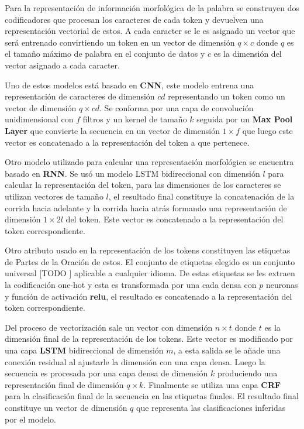 Para la representación de información morfológica de la palabra se construyen dos
codificadores que procesan los caracteres de cada token y devuelven una representación vectorial de estos.
A cada caracter se le es asignado un vector que será entrenado convirtiendo un token en un vector de dimensión
$q \times c$ donde $q$ es el tamaño máximo de palabra en el conjunto de datos y $c$ es la dimensión del vector
asignado a cada caracter.

Uno de estos modelos está basado en \textbf{CNN}, este modelo entrena una representación de caracteres de dimensión
$cd$ representando un token como un vector de dimensión $q \times cd$. Se conforma por una capa de convolución unidimensional
con $f$ filtros y un kernel de tamaño $k$ seguida por un \textbf{Max Pool Layer} que convierte la secuencia en un vector
de dimensión $1 \times f$ que luego este vector es concatenado a la representación del token a que pertenece.

Otro modelo utilizado para calcular una representación morfológica se encuentra basado en \textbf{RNN}. Se usó
un modelo LSTM bidireccional con dimensión $l$ para calcular la representación del token, para las dimensiones de los caracteres se
utilizan vectores de tamaño $l$, el resultado final constituye la concatenación de la corrida hacia adelante y la corrida
hacia atrás formando una representación de dimensión $1 \times 2l$ del token. Este vector es concatenado a la representación
del token correspondiente.

Otro atributo usado en la representación de los tokens constituyen las etiquetas de Partes de la Oración de estos.
El conjunto de etiquetas elegido es un conjunto universal [TODO \cite{Referencia a la def}] aplicable a cualquier idioma.
De estas etiquetas se les extraen la codificación one-hot y esta es transformada por una cada densa con $p$ neuronas
y función de activación \textbf{relu}, el resultado es concatenado a la representación del token correspondiente.

Del proceso de vectorización sale un vector con dimensión $n \times t$ donde $t$ es la dimensión final de la representación
de los tokens. Este vector es modificado por una capa \textbf{LSTM} bidireccional de dimensión $m$, a esta salida se le 
añade una conexión residual al ajustarle la dimensión con una capa densa. Luego la secuencia es procesada por una 
capa densa de dimensión $k$ produciendo una representación final de dimensión $q \times k$.
Finalmente se utiliza una capa \textbf{CRF}
para la clasificación final de la secuencia en las etiquetas finales. El resultado final constituye un vector
de dimensión $q$ que representa las clasificaciones inferidas por el modelo.

